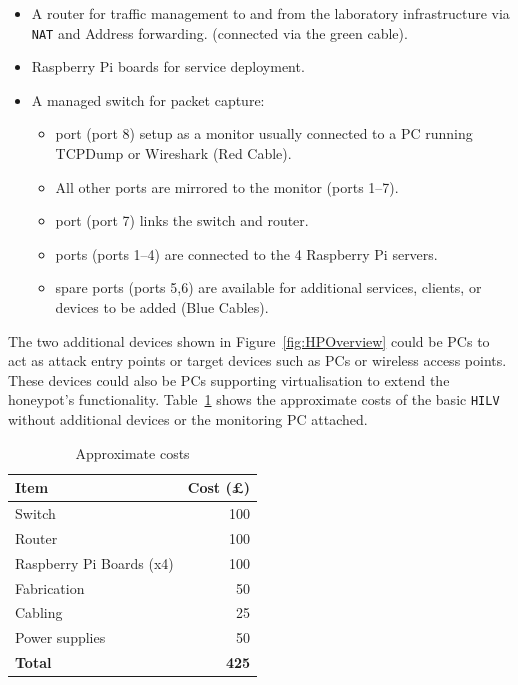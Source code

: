 \documentclass{llncs}
\begin{document}
\begin{itemize}
    \item \noindent A router for traffic management to and from the laboratory
      infrastructure via \texttt{NAT} and Address forwarding. (connected via the
      green cable).  \item {} Raspberry Pi boards for service deployment.
    \item \noindent A managed switch for packet capture:
    \begin{itemize}
        \item {} port (port 8) setup as a monitor usually connected to
          a PC running TCPDump or Wireshark (Red Cable).
        \item \noindent All other ports are mirrored to the monitor (ports
          1--7).
        \item {} port (port 7) links the switch and router.
        \item {} ports (ports 1--4) are connected to the 4 Raspberry Pi 
        servers.
        \item {} spare ports (ports 5,6) are available for additional
          services, clients, or devices to be added (Blue Cables).
    \end{itemize}
\end{itemize}

The two additional devices shown in Figure~\ref{fig:HPOverview} could be PCs to act as attack entry points or target devices such as PCs or wireless access points. These devices could also be PCs supporting virtualisation to extend the honeypot's functionality. Table~\ref{table:HoneypotCosts} shows the approximate costs of the basic \texttt{HILV} without additional devices or the monitoring PC attached.

\begin{table}[h]
\caption{Approximate costs\label{table:HoneypotCosts}}
\begin{center}
\begin{tabular}{| l | r |}
\hline
Item & Cost (\pounds) \\
\hline
Switch & 100 \\
\hline
Router & 100 \\
\hline
Raspberry Pi Boards (x4) & 100 \\
\hline
Fabrication & 50 \\
\hline
Cabling & 25 \\
\hline
Power supplies & 50 \\
\hline
\textbf{Total} & \textbf{425} \\
\hline
\end{tabular}
\end{center}
\end{table}
\end{document}
